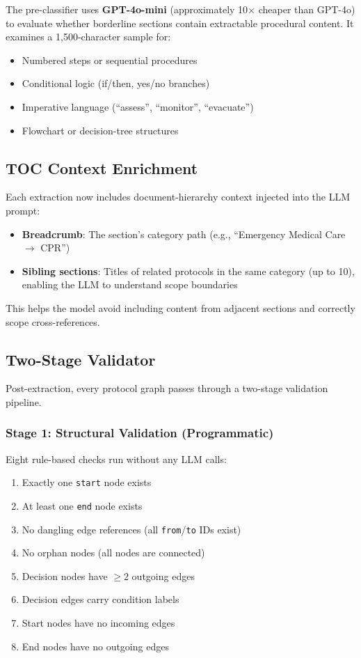 \documentclass[12pt,a4paper]{article}
\begin{document}
The pre-classifier uses \textbf{GPT-4o-mini} (approximately 10$\times$ cheaper than GPT-4o) to evaluate whether borderline sections contain extractable procedural content. It examines a 1,500-character sample for:
\begin{itemize}[leftmargin=2em]
    \item Numbered steps or sequential procedures
    \item Conditional logic (if/then, yes/no branches)
    \item Imperative language (``assess'', ``monitor'', ``evacuate'')
    \item Flowchart or decision-tree structures
\end{itemize}

\subsection{TOC Context Enrichment}
\label{sec:toc-context}

Each extraction now includes document-hierarchy context injected into the LLM prompt:
\begin{itemize}[leftmargin=2em]
    \item \textbf{Breadcrumb}: The section's category path (e.g., ``Emergency Medical Care $\rightarrow$ CPR'')
    \item \textbf{Sibling sections}: Titles of related protocols in the same category (up to 10), enabling the LLM to understand scope boundaries
\end{itemize}

This helps the model avoid including content from adjacent sections and correctly scope cross-references.

\subsection{Two-Stage Validator}
\label{sec:validator}

Post-extraction, every protocol graph passes through a two-stage validation pipeline.

\subsubsection{Stage 1: Structural Validation (Programmatic)}

Eight rule-based checks run without any LLM calls:
\begin{enumerate}[leftmargin=2em]
    \item Exactly one \texttt{start} node exists
    \item At least one \texttt{end} node exists
    \item No dangling edge references (all \texttt{from}/\texttt{to} IDs exist)
    \item No orphan nodes (all nodes are connected)
    \item Decision nodes have $\geq 2$ outgoing edges
    \item Decision edges carry condition labels
    \item Start nodes have no incoming edges
    \item End nodes have no outgoing edges
\end{enumerate}
\end{document}
